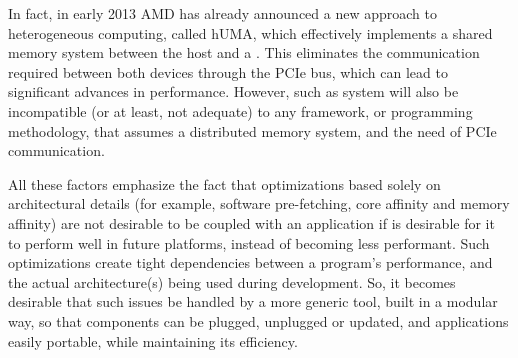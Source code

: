 \documentclass[main.tex]{subfiles}
\begin{document}
In fact, in early 2013 AMD has already announced a new approach to heterogeneous computing, called \acs{hUMA}, which effectively implements a shared memory system between the host \cpu and a \gpu \cite{hUMA}. This eliminates the communication required between both devices through the \acs{PCIe} bus, which can lead to significant advances in performance. However, such as system will also be incompatible (or at least, not adequate) to any framework, or programming methodology, that assumes a distributed memory system, and the need of \acs{PCIe} communication.

All these factors emphasize the fact that optimizations based solely on architectural details (for example, software pre-fetching, core affinity and memory affinity) are not desirable to be coupled with an application if is desirable for it to perform well in future platforms, instead of becoming less performant. Such optimizations create tight dependencies between a program's performance, and the actual architecture(s) being used during development. So, it becomes desirable that such issues be handled by a more generic tool, built in a modular way, so that components can be plugged, unplugged or updated, and applications easily portable, while maintaining its efficiency.
\end{document}
